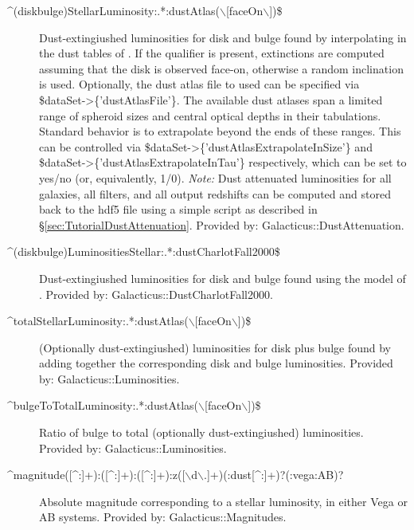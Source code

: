 \begin{description}
 \item[{\normalfont \ttfamily \textasciicircum(disk\textbar bulge)StellarLuminosity:.*:dustAtlas($\backslash$[faceOn$\backslash$])\$}] Dust-extingiushed luminosities for disk and bulge found by interpolating in the dust tables of \cite{ferrara_atlas_1999}. If the {\normalfont \ttfamily [faceOn]} qualifier is present, extinctions are computed assuming that the disk is observed face-on, otherwise a random inclination is used. Optionally, the dust atlas file to used can be specified via {\normalfont \ttfamily \$dataSet-\textgreater\{'dustAtlasFile'\}}. The available dust atlases span a limited range of spheroid sizes and central optical depths in their tabulations. Standard behavior is to extrapolate beyond the ends of these ranges. This can be controlled via {\normalfont \ttfamily \$dataSet-\textgreater\{'dustAtlasExtrapolateInSize'\}} and {\normalfont \ttfamily \$dataSet-\textgreater\{'dustAtlasExtrapolateInTau'\}} respectively, which can be set to {\normalfont \ttfamily yes}/{\normalfont \ttfamily no} (or, equivalently, 1/0). \emph{Note:} Dust attenuated luminosities for all galaxies, all filters, and all output redshifts can be computed and stored back to the \gls{hdf5} file using a simple script as described in \S\ref{sec:TutorialDustAttenuation}. Provided by: {\normalfont \ttfamily Galacticus::DustAttenuation}.
 \item[{\normalfont \ttfamily \textasciicircum(disk\textbar bulge)LuminositiesStellar:.*:dustCharlotFall2000\$}] Dust-extingiushed luminosities for disk and bulge found using the model of \cite{charlot_simple_2000}. Provided by: {\normalfont \ttfamily Galacticus::DustCharlotFall2000}.
 \item[{\normalfont \ttfamily \textasciicircum totalStellarLuminosity:.*:dustAtlas($\backslash$[faceOn$\backslash$])\$}] (Optionally dust-extingiushed) luminosities for disk plus bulge found by adding together the corresponding disk and bulge luminosities. Provided by: {\normalfont \ttfamily Galacticus::Luminosities}.
 \item[{\normalfont \ttfamily \textasciicircum bulgeToTotalLuminosity:.*:dustAtlas($\backslash$[faceOn$\backslash$])\$}] Ratio of bulge to total (optionally dust-extingiushed) luminosities. Provided by: {\normalfont \ttfamily Galacticus::Luminosities}.
 \item[{\normalfont \ttfamily \textasciicircum magnitude([\textasciicircum :]+):([\textasciicircum :]+):([\textasciicircum :]+):z([$\backslash$d$\backslash$.]+)(:dust[\textasciicircum :]+)?(:vega\textbar :AB)?}] Absolute magnitude corresponding to a stellar luminosity, in either Vega or AB systems. Provided by: {\normalfont \ttfamily Galacticus::Magnitudes}.

\end{description}
